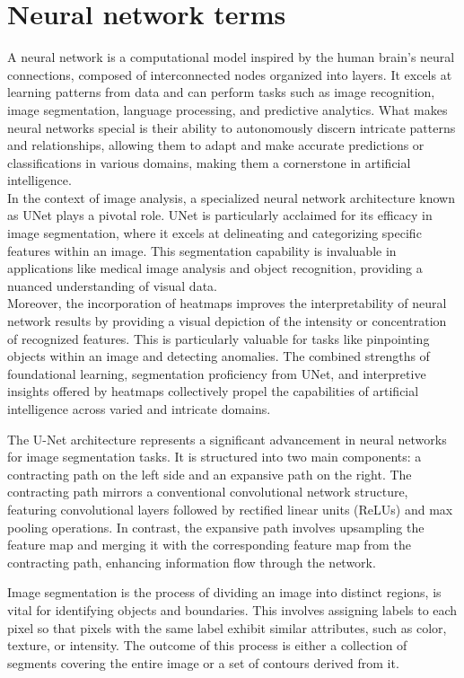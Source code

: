 \documentclass[preprint,12pt]{elsarticle}
\begin{document}
\section{Neural network terms}
A neural network is a computational model inspired by the human brain's neural connections, composed of interconnected nodes organized into layers. It excels at learning patterns from data and can perform tasks such as image recognition, image segmentation, language processing, and predictive analytics. What makes neural networks special is their ability to autonomously discern intricate patterns and relationships, allowing them to adapt and make accurate predictions or classifications in various domains, making them a cornerstone in artificial intelligence. \\
In the context of image analysis, a specialized neural network architecture known as UNet plays a pivotal role. UNet is particularly acclaimed for its efficacy in image segmentation, where it excels at delineating and categorizing specific features within an image. This segmentation capability is invaluable in applications like medical image analysis and object recognition, providing a nuanced understanding of visual data.\\
Moreover, the incorporation of heatmaps improves the interpretability of neural network results by providing a visual depiction of the intensity or concentration of recognized features. This is particularly valuable for tasks like pinpointing objects within an image and detecting anomalies. The combined strengths of foundational learning, segmentation proficiency from UNet, and interpretive insights offered by heatmaps collectively propel the capabilities of artificial intelligence across varied and intricate domains.

The U-Net architecture represents a significant advancement in neural networks for image segmentation tasks.
It is structured into two main components: a contracting path on the left side and an expansive path on the right.
The contracting path mirrors a conventional convolutional network structure, featuring convolutional layers followed by rectified linear units (ReLUs) and max pooling operations.
In contrast, the expansive path involves upsampling the feature map and merging it with the corresponding feature map from the contracting path, enhancing information flow through the network.

Image segmentation is the process of dividing an image into distinct regions, is vital for identifying objects and boundaries.
This involves assigning labels to each pixel so that pixels with the same label exhibit similar attributes, such as color, texture, or intensity.
The outcome of this process is either a collection of segments covering the entire image or a set of contours derived from it.
\end{document}
